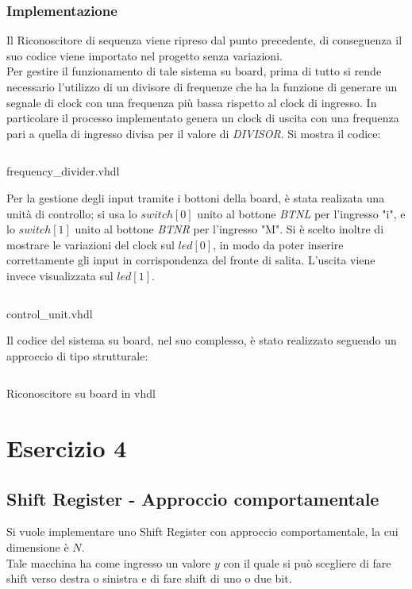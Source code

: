 \subsection{Implementazione}
Il Riconoscitore di sequenza viene ripreso dal punto precedente, di conseguenza il suo codice viene importato nel progetto senza variazioni.\\
Per gestire il funzionamento di tale sistema su board, prima di tutto si rende necessario l'utilizzo di un divisore di frequenze che ha la funzione di generare un segnale di clock con una frequenza più bassa rispetto al clock di ingresso. In particolare il  processo implementato genera un clock di uscita con una frequenza pari a quella di ingresso divisa per il valore di \textit{DIVISOR}.
Si mostra il codice:
\begin{code}
    \inputminted[frame=lines, framesep=2mm, baselinestretch=1.2, bgcolor=LightGray, fontsize=\footnotesize, linenos]{vhdl}{vhdl_files/seq_rec_Board/freq_div.vhd}
    \caption{frequency\_divider.vhdl}
    \label{lst:SR_beh}
\end{code}
Per la gestione degli input tramite i bottoni della board, è stata realizata una unità di controllo; si usa lo $switch[0]$ unito al bottone \textit{BTNL} per l'ingresso "i", e lo $switch[1]$ unito al bottone \textit{BTNR} per l'ingresso "M". Si è scelto inoltre di mostrare le variazioni del clock sul $led[0]$, in modo da poter inserire correttamente gli input in corrispondenza del fronte di salita. L'uscita viene invece visualizzata sul $led[1]$.
\begin{code}
    \inputminted[frame=lines, framesep=2mm, baselinestretch=1.2, bgcolor=LightGray, fontsize=\footnotesize, linenos]{vhdl}{vhdl_files/seq_rec_Board/control_unit.vhd}
    \caption{control\_unit.vhdl}
    \label{lst:SR_beh}
\end{code}
Il codice del sistema su board, nel suo complesso, è stato realizzato seguendo un approccio di tipo strutturale:
\begin{code}
    \inputminted[frame=lines, framesep=2mm, baselinestretch=1.2, bgcolor=LightGray, fontsize=\footnotesize, linenos]{vhdl}{vhdl_files/seq_rec_Board/RecOnBoard.vhd}
    \caption{Riconoscitore su board in vhdl}
    \label{lst:SR_beh}
\end{code}


\chapter{Esercizio 4}
\section{Shift Register - Approccio comportamentale}
Si vuole implementare uno Shift Register con approccio comportamentale, la cui dimensione è $N$.\\
Tale macchina ha come ingresso un valore $y$ con il quale si può scegliere di fare shift verso destra o sinistra e di fare shift di uno o due bit.

